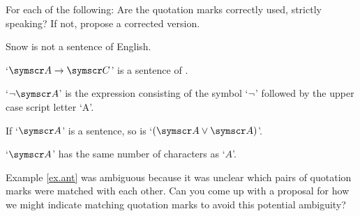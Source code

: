 

\practiceproblems

\solutions
\problempart
\label{pr.usemention}
For each of the following: Are the quotation marks correctly used, strictly speaking? If not, propose a corrected version.
\begin{earg}
\item Snow is not a sentence of English.
\item `$\meta{A} \eif \meta{C}$' is a sentence of \TFL.
\item `$\enot\meta{A}$' is the expression consisting of the symbol `$\neg$' followed by the upper case script letter `A'. %
\item If `$\meta{A}$' is a sentence, so is `$(\meta{A} \eor \meta{A})$'. %
\item `$\meta{A}$' has the same number of characters as `$A$'.
\end{earg}

\problempart Example \ref{ex.ant} was ambiguous because it was unclear which pairs of quotation marks were matched with each other. Can you come up with a proposal for how we might indicate matching quotation marks to avoid this potential ambiguity?

